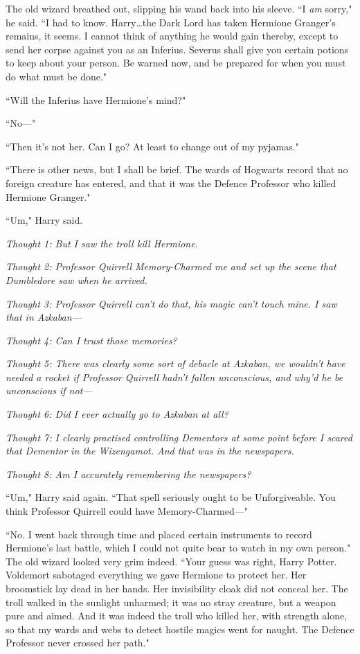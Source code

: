 The old wizard breathed out, slipping his wand back into his sleeve. ``I \emph{am} sorry," he said. ``I had to know. Harry…the Dark Lord has taken Hermione Granger's remains, it seems. I cannot think of anything he would gain thereby, except to send her corpse against you as an Inferius. Severus shall give you certain potions to keep about your person. Be warned now, and be prepared for when you must do what must be done."

``Will the Inferius have Hermione's mind?"

``No—"

``Then it's not her. Can I go? At least to change out of my pyjamas."

``There is other news, but I shall be brief. The wards of Hogwarts record that no foreign creature has entered, and that it was the Defence Professor who killed Hermione Granger."

``Um," Harry said.

\emph{Thought 1: But I saw the troll kill Hermione.}

\emph{Thought 2: Professor Quirrell Memory-Charmed me and set up the scene that Dumbledore saw when he arrived.}

\emph{Thought 3: Professor Quirrell can't do that, his magic can't touch mine. I saw that in Azkaban—}

\emph{Thought 4: Can I trust those memories?}

\emph{Thought 5: There was clearly some sort of debacle at Azkaban, we wouldn't have needed a rocket if Professor Quirrell hadn't fallen unconscious, and why'd he be unconscious if not—}

\emph{Thought 6: Did I ever actually go to Azkaban at all?}

\emph{Thought 7: I clearly practised controlling Dementors at some point before I scared that Dementor in the Wizengamot. And \emph{that} was in the newspapers.}

\emph{Thought 8: Am I accurately remembering the newspapers?}

``Um," Harry said again. ``That spell seriously ought to be Unforgiveable. You think Professor Quirrell could have Memory-Charmed—"

``No. I went back through time and placed certain instruments to record Hermione's last battle, which I could not quite bear to watch in my own person." The old wizard looked very grim indeed. ``Your guess was right, Harry Potter. Voldemort sabotaged everything we gave Hermione to protect her. Her broomstick lay dead in her hands. Her invisibility cloak did not conceal her. The troll walked in the sunlight unharmed; it was no stray creature, but a weapon pure and aimed. And it was indeed the troll who killed her, with strength alone, so that my wards and webs to detect hostile magics went for naught. The Defence Professor never crossed her path."

